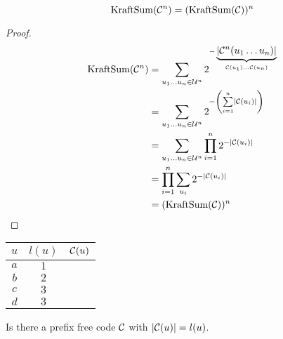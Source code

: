 \begin{proposition}
    \[
        \operatorname{KraftSum}(\mathcal{C}^n) = (\operatorname{KraftSum}(\mathcal{C}))^n
    \]
\end{proposition}
\begin{proof}
    \[
        \begin{aligned}
            \operatorname{KraftSum}(\mathcal{C}^n) &= \sum\limits_{u_1\ldots u_n\in\mathcal{U}^n} 2^{-\underbrace{\left\lvert\mathcal{C}^n(u_1\ldots u_n)\right\rvert}_{\mathcal{C}(u_1)\ldots\mathcal{C}(u_n)}}\\
            &= \sum\limits_{u_1\ldots u_n\in\mathcal{U}^n} 2^{-\left(\sum\limits_{i=1}^n\left\lvert \mathcal{C}(u_i) \right\rvert\right)}\\
            &= \sum\limits_{u_1\ldots u_n\in\mathcal{U}^n} \prod\limits_{i=1}^n 2^{-\left\lvert\mathcal{C}(u_i) \right\rvert}\\
            &= \prod\limits_{i=1}^n \sum\limits_{u_i}2^{-\left\lvert \mathcal{C}(u_i)\right\rvert}\\
            &= (\operatorname{KraftSum(\mathcal{C})})^n
        \end{aligned}
    \]
\end{proof}

\begin{example}
	\begin{center}
	    \begin{tabular}{c|c|c}
	        $u$ & $l(u)$ & $\mathcal{C}(u)$\\\hline
	        $a$ & $1$ & \\
	        $b$ & $2$ & \\
	        $c$ & $3$ & \\
	        $d$ & $3$ & \\
	    \end{tabular}
	\end{center}
	
    Is there a prefix free code $\mathcal{C}$ with $\left\lvert \mathcal{C}(u) \right\rvert = l(u)$.
\end{example}

